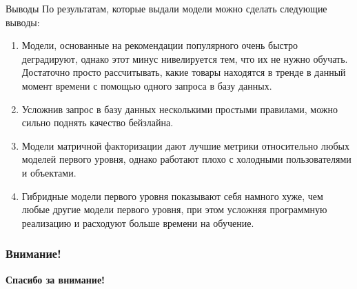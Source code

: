 \documentclass{beamer}
\begin{document}
\begin{frame}{Выводы}
  По результатам, которые выдали модели можно сделать следующие выводы:
\begin{enumerate}
    \item Модели, основанные на рекомендации популярного очень быстро деградируют, однако этот минус нивелируется
    тем, что их не нужно обучать. Достаточно просто рассчитывать, какие товары находятся в тренде в данный момент времени
    с помощью одного запроса в базу данных.
    \item Усложнив запрос в базу данных несколькими простыми правилами, можно сильно поднять качество бейзлайна.
    \item Модели матричной факторизации дают лучшие метрики относительно любых моделей первого уровня, однако работают плохо
    с холодными пользователями и объектами.
    \item Гибридные модели первого уровня показывают себя намного хуже, чем любые другие модели первого уровня, при этом усложняя
    программную реализацию и расходуют больше времени на обучение.
\end{enumerate}
\end{frame}

\begin{frame}
  \frametitle{Внимание!}

  \begin{center}
    {\Huge \textbf{Спасибо за внимание!}}
  \end{center}
\end{frame}
\end{document}
